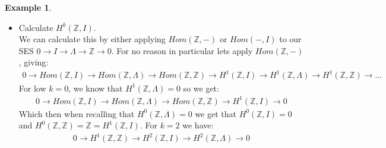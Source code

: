 \documentclass[12pt]{book}
\theoremstyle{definition}
\newtheorem{example}[theorem]{Example}
\begin{document}
\begin{example}
\begin{itemize}
        \begin{align*}
            0 \rightarrow Hom(\mathbb{Z}, \Lambda) \rightarrow Hom(\Lambda, \Lambda) \rightarrow Hom(I, \Lambda)  \rightarrow H^1(\mathbb{Z}, \Lambda) \rightarrow H^1(\Lambda, \Lambda) \rightarrow \dots 
        \end{align*}
        Using our previous results, $Hom(\mathbb{Z}, \Lambda) = 0 = H^1(\mathbb{Z}, \Lambda)$, $H^1(\Lambda, \Lambda) = 0$ as $\Lambda$ is free over itself, and $Hom(\Lambda, \Lambda) = \Lambda$ by \ref{Homid}. So we get
        \begin{align*}
            0 \rightarrow 0 \rightarrow \Lambda \rightarrow Hom(I, \Lambda) \rightarrow 0 \rightarrow 0
        \end{align*}
        So $\Lambda \cong Hom(I, \Lambda) = H^0(I, \Lambda)$.\\
        Note that in theory we could've calculated the last two sets of cohomology groups by using the resolution $\mathcal{E}$, but this is much faster!
        \item Calculate $H^k(\mathbb{Z}, I)$.\\
        We can calculate this by either applying $Hom(\mathbb{Z}, -)$ or $Hom(-, I)$ to our SES $0 \rightarrow I \rightarrow \Lambda \rightarrow \mathbb{Z} \rightarrow 0$. For no reason in particular lets apply $Hom(\mathbb{Z}, -)$, giving: 
        \begin{align*}
            0 \rightarrow Hom(\mathbb{Z}, I) \rightarrow Hom(\mathbb{Z}, \Lambda) \rightarrow Hom(\mathbb{Z}, \mathbb{Z}) \rightarrow H^1(\mathbb{Z}, I) \rightarrow H^1(\mathbb{Z}, \Lambda) \rightarrow H^1(\mathbb{Z}, \mathbb{Z}) \rightarrow \dots
        \end{align*}
        For low $k = 0$, we know that $H^1(\mathbb{Z}, \Lambda) = 0$ so we get: 
        \begin{align*}
             0 \rightarrow Hom(\mathbb{Z}, I) \rightarrow Hom(\mathbb{Z}, \Lambda) \rightarrow Hom(\mathbb{Z}, \mathbb{Z}) \rightarrow H^1(\mathbb{Z}, I) \rightarrow 0 
        \end{align*}
        Which then when recalling that $H^0(\mathbb{Z}, \Lambda) = 0$ we get that $H^0(\mathbb{Z}, I) = 0$ and $H^0(\mathbb{Z}, \mathbb{Z}) = \mathbb{Z} = H^1(\mathbb{Z}, I)$. For $k = 2$ we have: 
        \begin{align*}
            0 \rightarrow H^1(\mathbb{Z}, \mathbb{Z}) \rightarrow H^2(\mathbb{Z}, I) \rightarrow H^2(\mathbb{Z}, \Lambda) \rightarrow 0 
        \end{align*}

\end{itemize}
\end{example}
\end{document}
